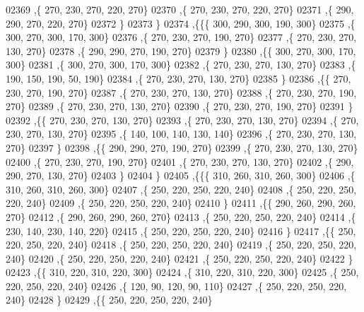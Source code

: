 \begin{DoxyCode}
02369     ,\{   270,   230,   270,   220,   270\}
02370     ,\{   270,   230,   270,   220,   270\}
02371     ,\{   290,   290,   270,   220,   270\}
02372     \}
02373    \}
02374   ,\{\{\{   300,   290,   300,   190,   300\}
02375     ,\{   300,   270,   300,   170,   300\}
02376     ,\{   270,   230,   270,   190,   270\}
02377     ,\{   270,   230,   270,   130,   270\}
02378     ,\{   290,   290,   270,   190,   270\}
02379     \}
02380    ,\{\{   300,   270,   300,   170,   300\}
02381     ,\{   300,   270,   300,   170,   300\}
02382     ,\{   270,   230,   270,   130,   270\}
02383     ,\{   190,   150,   190,    50,   190\}
02384     ,\{   270,   230,   270,   130,   270\}
02385     \}
02386    ,\{\{   270,   230,   270,   190,   270\}
02387     ,\{   270,   230,   270,   130,   270\}
02388     ,\{   270,   230,   270,   190,   270\}
02389     ,\{   270,   230,   270,   130,   270\}
02390     ,\{   270,   230,   270,   190,   270\}
02391     \}
02392    ,\{\{   270,   230,   270,   130,   270\}
02393     ,\{   270,   230,   270,   130,   270\}
02394     ,\{   270,   230,   270,   130,   270\}
02395     ,\{   140,   100,   140,   130,   140\}
02396     ,\{   270,   230,   270,   130,   270\}
02397     \}
02398    ,\{\{   290,   290,   270,   190,   270\}
02399     ,\{   270,   230,   270,   130,   270\}
02400     ,\{   270,   230,   270,   190,   270\}
02401     ,\{   270,   230,   270,   130,   270\}
02402     ,\{   290,   290,   270,   130,   270\}
02403     \}
02404    \}
02405   ,\{\{\{   310,   260,   310,   260,   300\}
02406     ,\{   310,   260,   310,   260,   300\}
02407     ,\{   250,   220,   250,   220,   240\}
02408     ,\{   250,   220,   250,   220,   240\}
02409     ,\{   250,   220,   250,   220,   240\}
02410     \}
02411    ,\{\{   290,   260,   290,   260,   270\}
02412     ,\{   290,   260,   290,   260,   270\}
02413     ,\{   250,   220,   250,   220,   240\}
02414     ,\{   230,   140,   230,   140,   220\}
02415     ,\{   250,   220,   250,   220,   240\}
02416     \}
02417    ,\{\{   250,   220,   250,   220,   240\}
02418     ,\{   250,   220,   250,   220,   240\}
02419     ,\{   250,   220,   250,   220,   240\}
02420     ,\{   250,   220,   250,   220,   240\}
02421     ,\{   250,   220,   250,   220,   240\}
02422     \}
02423    ,\{\{   310,   220,   310,   220,   300\}
02424     ,\{   310,   220,   310,   220,   300\}
02425     ,\{   250,   220,   250,   220,   240\}
02426     ,\{   120,    90,   120,    90,   110\}
02427     ,\{   250,   220,   250,   220,   240\}
02428     \}
02429    ,\{\{   250,   220,   250,   220,   240\}

\end{DoxyCode}
